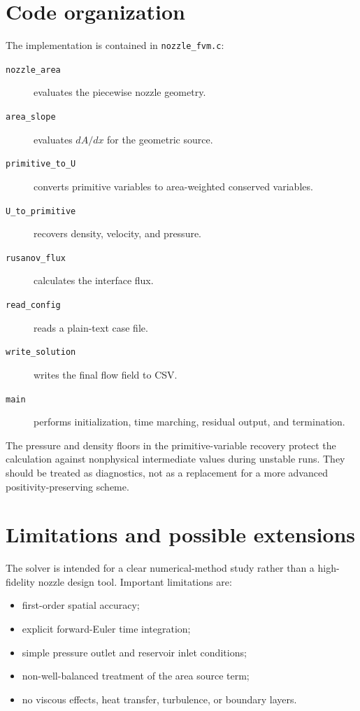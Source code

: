 \documentclass[11pt,a4paper]{article}
\begin{document}
\section{Code organization}
The implementation is contained in \texttt{nozzle\_fvm.c}:
\begin{description}
  \item[\texttt{nozzle\_area}] evaluates the piecewise nozzle geometry.
  \item[\texttt{area\_slope}] evaluates $dA/dx$ for the geometric source.
  \item[\texttt{primitive\_to\_U}] converts primitive variables to area-weighted conserved variables.
  \item[\texttt{U\_to\_primitive}] recovers density, velocity, and pressure.
  \item[\texttt{rusanov\_flux}] calculates the interface flux.
  \item[\texttt{read\_config}] reads a plain-text case file.
  \item[\texttt{write\_solution}] writes the final flow field to CSV.
  \item[\texttt{main}] performs initialization, time marching, residual output, and termination.
\end{description}

The pressure and density floors in the primitive-variable recovery protect the
calculation against nonphysical intermediate values during unstable runs. They
should be treated as diagnostics, not as a replacement for a more advanced
positivity-preserving scheme.

\section{Limitations and possible extensions}
The solver is intended for a clear numerical-method study rather than a
high-fidelity nozzle design tool. Important limitations are:
\begin{itemize}
  \item first-order spatial accuracy;
  \item explicit forward-Euler time integration;
  \item simple pressure outlet and reservoir inlet conditions;
  \item non-well-balanced treatment of the area source term;
  \item no viscous effects, heat transfer, turbulence, or boundary layers.
\end{itemize}
\end{document}
